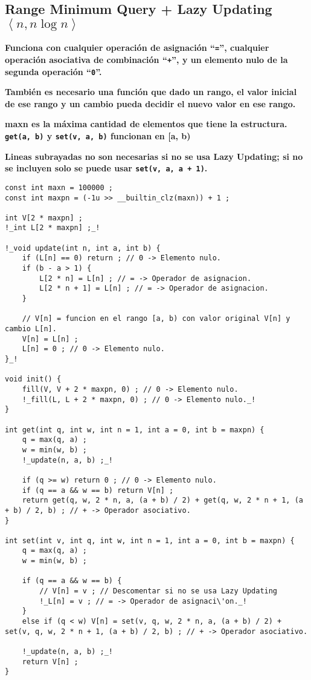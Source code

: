 \documentclass[10pt,landscape,twocolumn,a4paper,notitlepage]{article}
\def\nbcoment#1{\begin{small}\textbf{#1}\end{small}}
\begin{document}
\subsection{Range Minimum Query + Lazy Updating $\left<n, n \log n\right>$}
\nbcoment{Funciona con cualquier operaci\'on de asignaci\'on ``\texttt{=}'', cualquier operaci\'on asociativa de combinaci\'on ``\texttt{+}'', y un elemento nulo de la segunda operaci\'on ``\texttt{0}''.}
\nbcoment{Tambi\'en es necesario una funci\'on que dado un rango, el valor inicial de ese rango y un cambio pueda decidir el nuevo valor en ese rango.}
\nbcoment{maxn es la m\'axima cantidad de elementos que tiene la estructura. \texttt{get(a, b)} y \texttt{set(v, a, b)} funcionan en [a, b)}
\nbcoment{Lineas subrayadas no son necesarias si no se usa Lazy Updating; si no se incluyen solo se puede usar \texttt{set(v, a, a + 1)}.}
\begin{lstlisting}[keepspaces=true]
const int maxn = 100000 ;
const int maxpn = (-1u >> __builtin_clz(maxn)) + 1 ;

int V[2 * maxpn] ;
!_int L[2 * maxpn] ;_!

!_void update(int n, int a, int b) {
	if (L[n] == 0) return ; // 0 -> Elemento nulo.
	if (b - a > 1) {
		L[2 * n] = L[n] ; // = -> Operador de asignacion.
		L[2 * n + 1] = L[n] ; // = -> Operador de asignacion.
	}
	
	// V[n] = funcion en el rango [a, b) con valor original V[n] y cambio L[n].
	V[n] = L[n] ;
	L[n] = 0 ; // 0 -> Elemento nulo.
}_!

void init() {
	fill(V, V + 2 * maxpn, 0) ; // 0 -> Elemento nulo.
	!_fill(L, L + 2 * maxpn, 0) ; // 0 -> Elemento nulo._!
}

int get(int q, int w, int n = 1, int a = 0, int b = maxpn) {
	q = max(q, a) ;
	w = min(w, b) ;
	!_update(n, a, b) ;_!

	if (q >= w) return 0 ; // 0 -> Elemento nulo.
	if (q == a && w == b) return V[n] ;
	return get(q, w, 2 * n, a, (a + b) / 2) + get(q, w, 2 * n + 1, (a + b) / 2, b) ; // + -> Operador asociativo.
}

int set(int v, int q, int w, int n = 1, int a = 0, int b = maxpn) {
	q = max(q, a) ;
	w = min(w, b) ;

	if (q == a && w == b) {
		// V[n] = v ; // Descomentar si no se usa Lazy Updating
		!_L[n] = v ; // = -> Operador de asignaci\'on._!
	}
	else if (q < w) V[n] = set(v, q, w, 2 * n, a, (a + b) / 2) + set(v, q, w, 2 * n + 1, (a + b) / 2, b) ; // + -> Operador asociativo.

	!_update(n, a, b) ;_!
	return V[n] ;
}
\end{lstlisting}
%
\end{document}
